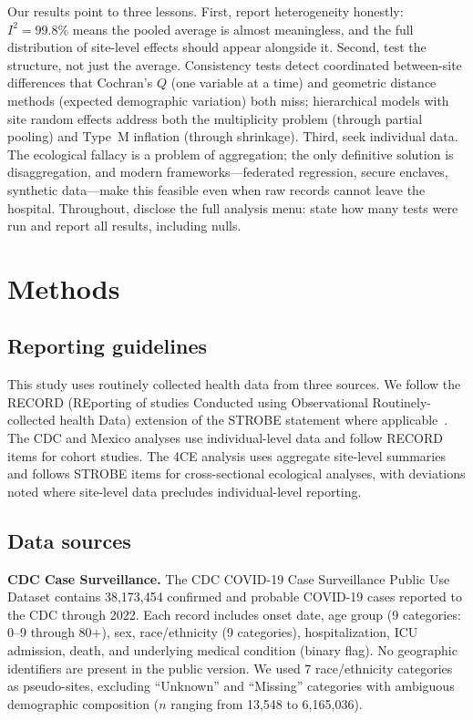 \documentclass[11pt]{article}
\begin{document}
Our results point to three lessons.  First, report heterogeneity honestly:
$I^2 = 99.8\%$ means the pooled average is almost meaningless, and the
full distribution of site-level effects should appear alongside it.
Second, test the structure, not just the average.  Consistency tests detect
coordinated between-site differences that Cochran's $Q$ (one variable at a
time) and geometric distance methods (expected demographic variation) both
miss; hierarchical models with site random effects address both the
multiplicity problem (through partial pooling) and Type~M inflation
(through shrinkage).  Third, seek individual data.  The ecological fallacy
is a problem of aggregation; the only definitive solution is
disaggregation, and modern frameworks---federated regression, secure
enclaves, synthetic data---make this feasible even when raw records cannot
leave the hospital.  Throughout, disclose the full analysis menu: state how
many tests were run and report all results, including nulls.


\section{Methods}

\subsection{Reporting guidelines}

This study uses routinely collected health data from three sources.
We follow the RECORD (REporting of studies Conducted using
Observational Routinely-collected health Data) extension of the
STROBE statement where applicable~\cite{benchimol2015record}.
The CDC and Mexico analyses use individual-level data and follow
RECORD items for cohort studies.  The 4CE analysis uses aggregate
site-level summaries and follows STROBE items for cross-sectional
ecological analyses, with deviations noted where site-level data
precludes individual-level reporting.

\subsection{Data sources}

\textbf{CDC Case Surveillance.}  The CDC COVID-19 Case Surveillance Public
Use Dataset contains 38,173,454 confirmed and probable COVID-19 cases reported
to the CDC through 2022.  Each record includes onset date, age group (9
categories: 0--9 through 80+), sex, race/ethnicity (9 categories),
hospitalization, ICU admission, death, and underlying medical condition (binary
flag).  No geographic identifiers are present in the public version.  We used
7 race/ethnicity categories as pseudo-sites, excluding ``Unknown'' and
``Missing'' categories with ambiguous demographic composition ($n$ ranging
from 13,548 to 6,165,036).
\end{document}
